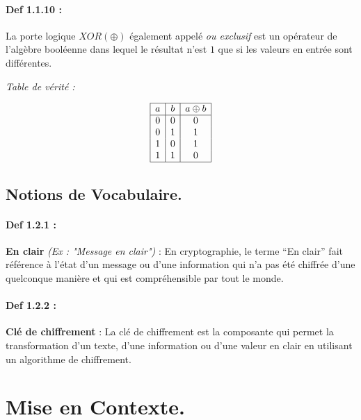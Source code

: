 \documentclass{article}
\begin{document}
\paragraph{Def 1.1.10 :}\label{def-1.1.10}

La porte logique \(XOR (\oplus)\) également appelé \textit{ou exclusif}
est un opérateur de l'algèbre booléenne dans lequel le résultat n'est
\(1\) que si les valeurs en entrée sont différentes.
\begin{center}
	\textit{Table de vérité :}
\end{center}
 \[
\begin{array}{|c|c|c|}
	\hline
	a & b & a \oplus b \\
	\hline
	0 & 0 & 0 \\
	0 & 1 & 1 \\
	1 & 0 & 1 \\
	1 & 1 & 0 \\
	\hline
\end{array}
\]

\subsection{Notions de Vocabulaire.}\label{notions-de-vocabulaire.}

\paragraph{Def 1.2.1 :}\label{def-1.2.1}

\textbf{En clair} \textit{(Ex : "Message en clair")} : En cryptographie,
le terme ``En clair'' fait référence à l'état d'un message ou d'une
information qui n'a pas été chiffrée d'une quelconque manière et qui est
compréhensible par tout le monde.

\paragraph{Def 1.2.2 :}\label{def-1.2.2}

\textbf{Clé de chiffrement} : La clé de chiffrement est la composante
qui permet la transformation d'un texte, d'une information ou d'une
valeur en clair en utilisant un algorithme de chiffrement.

\section{Mise en Contexte.}\label{contexte.}
\end{document}
